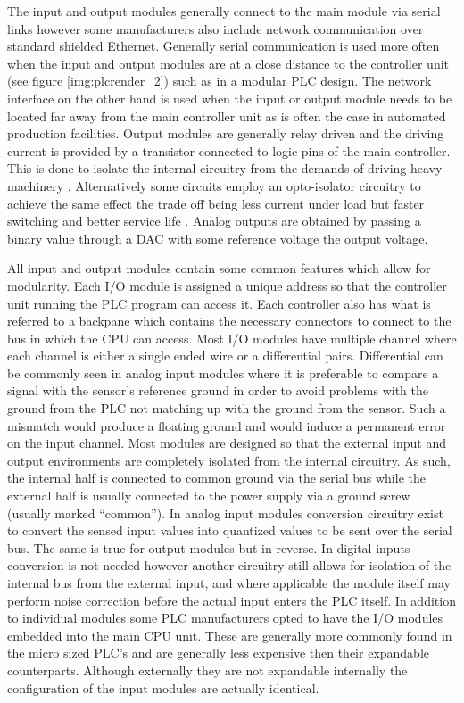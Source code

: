 The input and output modules generally connect to the main module via serial links however some manufacturers also include network communication over standard shielded Ethernet\cite{rockwell_io,rockwell_tech_pub}. Generally serial communication is used more often when the input and output modules are at a close distance to the controller unit (see figure \ref{img:plcrender_2}) such as in a modular PLC design. The network interface on the other hand is used when the input or output module needs to be located far away from the main controller unit \cite{rockwell_tech_pub} as is often the case in automated production facilities. Output modules are generally relay driven and the driving current is provided by a transistor connected to logic pins of the main controller. This is done to isolate the internal circuitry from the demands of driving heavy machinery \cite{plcapp}. Alternatively some circuits employ an opto-isolator circuitry to achieve the same effect the trade off being less current under load but faster switching and better service life \cite{plcapp}. Analog outputs are obtained by passing a binary value through a DAC with some reference voltage the output voltage.

All input and output modules contain some common  features which allow for modularity. Each I/O module is assigned a unique address so that the controller unit running the PLC program can access it. Each controller also has what is referred to a backpane which contains the necessary connectors to connect to the bus in which the CPU can access. Most I/O modules have multiple channel where each channel is either a single ended wire or a differential pairs. Differential can be commonly seen in analog input modules where it is preferable to compare a signal with the sensor's reference ground in order to avoid problems with the ground from the PLC not matching up with the ground from the sensor. Such a mismatch would produce a floating ground and would induce a permanent error on the input channel. Most modules are designed so that the external input and output environments are completely isolated from the internal circuitry. As such, the internal half is connected to common ground via the serial bus while the external half is usually connected to the power supply via a ground screw (usually marked ``common''). In analog input modules conversion circuitry exist to convert the sensed input values into quantized values to be sent over the serial bus. The same is true for output modules but in reverse. In digital inputs conversion is not needed however another circuitry still allows for isolation of the internal bus from the external input, and where applicable the module itself may perform noise correction before the actual input enters the PLC itself. In addition to individual modules some PLC manufacturers opted to have the I/O modules embedded into the main CPU unit. These are generally more commonly found in the micro sized PLC's and are generally less expensive then their expandable counterparts. Although externally they are not expandable internally the configuration of the input modules are actually identical.

